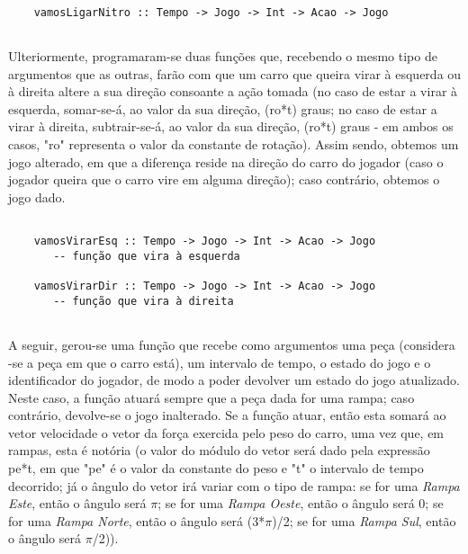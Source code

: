 \documentclass[a4paper]{report} %
\begin{document}
  \begin{verbatim}
      
    vamosLigarNitro :: Tempo -> Jogo -> Int -> Acao -> Jogo   
      
  \end{verbatim}
  
  \newpage
  
  \par \noindent Ulteriormente, programaram-se duas funções que, recebendo o mesmo tipo de argumentos que as outras, farão com que um carro que queira virar à esquerda ou à direita altere a sua direção consoante a ação tomada (no caso de estar a virar à esquerda, somar-se-á, ao valor da sua direção, (ro*t) graus; no caso de estar a virar à direita, subtrair-se-á, ao valor da sua direção, (ro*t) graus - em ambos os casos, "ro" representa o valor da constante de rotação). Assim sendo, obtemos um jogo alterado, em que a diferença reside na direção do carro do jogador (caso o jogador queira que o carro vire em alguma direção); caso contrário, obtemos o jogo dado. 
  
  \begin{verbatim}
      
    vamosVirarEsq :: Tempo -> Jogo -> Int -> Acao -> Jogo
       -- função que vira à esquerda
    
    vamosVirarDir :: Tempo -> Jogo -> Int -> Acao -> Jogo
       -- função que vira à direita
        
  \end{verbatim}
  
  \par \noindent A seguir, gerou-se uma função que recebe como argumentos uma peça (considera -se a peça em que o carro está), um intervalo de tempo, o estado do jogo e o identificador do jogador, de modo a poder devolver um estado do jogo atualizado. Neste caso, a função atuará sempre que a peça dada for uma rampa; caso contrário, devolve-se o jogo inalterado. Se a função atuar, então esta somará ao vetor velocidade o vetor da força exercida pelo peso do carro, uma vez que, em rampas, esta é notória (o valor do módulo do vetor será dado pela expressão pe*t, em que "pe" é o valor da constante do peso e "t" o intervalo de tempo decorrido; já o ângulo do vetor irá variar com o tipo de rampa: se for uma \textit{Rampa Este}, então o ângulo será $\pi$; se for uma \textit{Rampa Oeste}, então o ângulo será 0; se for uma \textit{Rampa Norte}, então o ângulo será (3*$\pi$)/2; se for uma \textit{Rampa Sul}, então o ângulo será $\pi$/2)).
  
\end{document}
